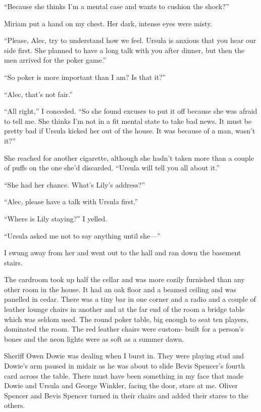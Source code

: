 \documentclass{novel}
\begin{document}
“Because she thinks I’m a mental case and wants to cushion the shock?”

\scenestars

Miriam put a hand on my chest. Her dark, intense eyes were misty. 

“Please, Alec, try to understand how we feel. Ursula is anxious that you hear our side first. She planned to have a long talk with you after dinner, but then the men arrived for the poker game.”

“So poker is more important than I am? Is that it?”

“Alec, that’s not fair.”

“All right,” I conceded. “So she found excuses to put it off because she was afraid to tell me. She thinks I’m not in a fit mental state to take bad news. It must be pretty bad if Ursula kicked her out of the house. It was because of a man, wasn’t it?”

She reached for another cigarette, although she hadn’t taken more than a couple of puffs on the one she’d discarded. “Ursula will tell you all about it.”

“She had her chance. What’s Lily’s address?”

“Alec, please have a talk with Ursula first.”

“Where is Lily staying?” I yelled.

“Ursula asked me not to say anything until she—”

I swung away from her and went out to the hall and ran down the basement stairs.

The cardroom took up half the cellar and was more cozily furnished than any other room in the house. It had an oak floor and a beamed ceiling and was panelled in cedar. There was a tiny bar in one corner and a radio and a couple of leather lounge chairs in another and at the far end of the room a bridge table which was seldom used. The round poker table, big enough to seat ten players, dominated the room. The red leather chairs were custom- built for a person’s bones and the neon lights were as soft as a summer dawn.

Sheriff Owen Dowie was dealing when I burst in. They were playing stud and Dowie’s arm paused in midair as he was about to slide Bevis Spencer’s fourth card across the table. There must have been something in my face that made Dowie and Ursula and George Winkler, facing the door, stare at me. Oliver Spencer and Bevis Spencer turned in their chairs and added their stares to the others.
\end{document}
